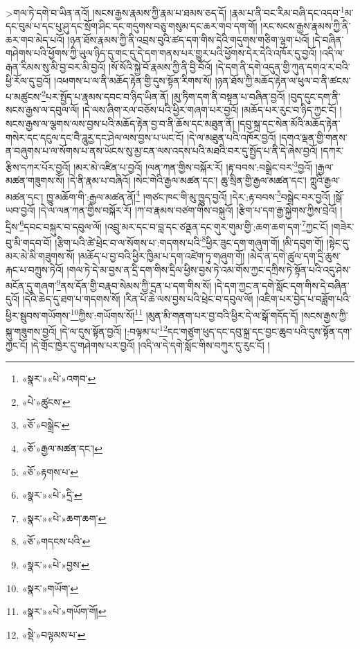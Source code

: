  >གལ་ཏེ་དགེ་བ་ཡིན་ནའོ། །སངས་རྒྱས་རྣམས་ཀྱི་རྣམ་པ་ཐམས་ཅད་དོ། །རྣམ་པ་ནི་བང་རིམ་བཞི་དང་འདབ་\footnote{«སྣར་»«པེ་»འགབ་}མ་དང་བུམ་པ་དང་པུ་ཤུ་དང་སྲོག་ཤིང་དང་གདུགས་བཅུ་གསུམ་དང་ཆར་གབ་དག་གོ། །རང་སངས་རྒྱས་རྣམས་ཀྱི་ནི་ཆར་གབ་མེད་པའོ། །ཉན་ཐོས་རྣམས་ཀྱི་ནི་འབྲས་བུའི་ཚད་དག་གིས་དེའི་གདུགས་གཅིག་ལྷག་པའོ། །དེ་བཞིན་གཤེགས་པའི་ཕྱོགས་ཀྱི་ཡུལ་ཉིད་དུ་གང་དུ་དེ་དག་གནས་པར་གྱུར་པའི་ཕྱོགས་དེར་དེའི་འཁོར་དུ་བྱའོ། །འདི་ལ་རྒན་རིམས་སུ་མི་བྱ་བར་མི་བྱའོ། །སོ་སོའི་སྐྱེ་བོ་རྣམས་ཀྱི་ནི་བྱི་བོའོ། །དེ་དག་ནི་དགེ་འདུན་གྱི་ཀུན་དགའ་ར་བའི་ཕྱི་རོལ་དུ་བྱའོ། །འཕགས་པ་ལ་ནི་མཆོད་རྟེན་གྱི་དུས་སྟོན་རིགས་སོ། །ཉན་ཐོས་ཀྱི་མཆོད་རྟེན་ལ་ཕུལ་བ་ནི་ཚངས་པ་མཚུངས་\footnote{«པེ་»ཚུངས་}པར་སྤྱོད་པ་རྣམས་དབང་བ་ཉིད་ཡིན་ནོ། །མུ་ཏིག་དག་ནི་བསྟན་པ་བཞིན་བྱའོ། །བུད་དུང་དག་ནི་སངས་རྒྱས་ལ་དབུལ་ལོ། །དེ་ལས་ཞིག་རལ་བཅོས་པའི་ཕྱིར་གཞག་པར་བྱའོ། །མཆོད་པར་རུང་བ་ཉིད་ཀྱང་ངོ། །སངས་རྒྱས་ལ་ལྕགས་ལས་བྱས་པའི་མཆོད་རྟེན་བྱ་བ་ནི་ཆོས་དང་མཐུན་ནོ། །དབུ་སྐྲ་དང་སེན་མོའི་མཆོད་རྟེན་གསེར་དང་དངུལ་དང་བཻ་ཌཱུརྱ་དང་ཤེལ་ལས་བྱས་པ་ཡང་ངོ། །དེ་ལ་མཐུན་པའི་འཁོར་བྱའོ། །དགའ་ལྡན་གྱི་གནས་ན་བཞུགས་པ་ལ་སོགས་པ་ནས་ཡོངས་སུ་མྱ་ངན་ལས་འདས་པའི་མཐའི་བར་དུ་སྤྱོད་པ་ནི་དེ་ཞེས་བྱའོ། །དཀར་རྩིས་དཀར་པོར་བྱའོ། །མར་མེ་འཛིན་པ་བྱའོ། །ལན་ཀན་གྱིས་བསྐོར་རོ། །རྟ་བབས་:བསྒྲེང་བར་\footnote{«ཅོ་»བསྒྲེང་}བྱའོ། །རྒྱལ་མཚན་གཟུགས་སོ། །དེ་ནི་རྣམ་པ་བཞིའོ། །སེང་གེའི་རྒྱལ་མཚན་དང་། ཆུ་སྲིན་གྱི་རྒྱལ་མཚན་དང་། ཀླུའི་རྒྱལ་མཚན་དང་། ཁྱུ་མཆོག་གི་:རྒྱལ་མཚན་ནོ།\footnote{«ཅོ་»རྒྱལ་མཚན་དང་།} །གཙང་ཁང་གི་མུ་ཁྱུད་བྱའོ། །དེར་:རྟ་བབས་\footnote{«ཅོ་»རྟགས་པ་}བསྒྲེང་བར་བྱའོ། །སྒོ་ཡབ་བྱའོ། །དེ་ལ་ལན་ཀན་གྱིས་བསྐོར་རོ། །ཀ་བ་རྣམས་བཙག་གིས་བསྐུའོ། །རྩིག་པ་དག་རྒྱ་སྐྱེགས་ཀྱིས་བྲེའོ། །དྲིས་\footnote{«སྣར་»«པེ་»དྲི་}དབང་བསྐུར་བ་དབུལ་ལོ། །འབྲུ་མར་དང་བ་བླ་དང་ཙནྡན་དང་གུར་གུམ་གྱི་:ཆག་ཆག་དག་\footnote{«སྣར་»«པེ་»ཆག་ཆག་}ཀྱང་ངོ། །གཟེར་བུ་མི་གདབ་བོ། །རྩིག་པའི་ཚེ་ཕྲེང་བ་ལ་སོགས་པ་:གདགས་པའི་\footnote{«ཅོ་»གདངས་པའི་}ཕྱིར་ཟུང་དག་གཞུག་གོ། །མི་དབུག་གོ། །སྟེང་དུ་མར་མེ་མི་གཟུགས་སོ། །མཆོད་པ་བྱ་བའི་ཕྱིར་ཁྱིམ་པ་དག་འཛེག་ཏུ་གཞུག་གོ། །མེད་ན་དགེ་ཚུལ་དག་དྲི་ཆུས་རྐང་པ་བཀྲུས་ཏེའོ། །གལ་ཏེ་དེ་མ་བྱས་ན་དྲི་དག་གིས་དྲིལ་ཕྱིས་བྱས་ཏེ་འམ་གོས་ཀྱང་དཀྲིས་ཏེ་སྟོན་པའི་འདུ་ཤེས་མངོན་དུ་གཞག་\footnote{«སྣར་»«པེ་»བྱས་}ནས་དོན་གྱི་བརྣབ་སེམས་ཀྱི་དྲན་པ་དག་གིས་སོ། །དེ་དག་ཀྱང་ན་དགེ་སློང་དག་གིས་དེ་བཞིན་དུའོ། །དེའི་ཆེད་དུ་ཐག་པ་གདགས་སོ། །རིན་པོ་ཆེ་ལས་བྱས་པའི་ཕྲེང་བ་དབུལ་ལོ། །འཇིག་པར་བྱེད་པ་བཟློག་པའི་ཕྱིར་སྦུབས་གཡོགས་\footnote{«སྣར་»གཡོག་}ཀྱིས་:གཡོགས་སོ།\footnote{«སྣར་»«པེ་»གཡོག་གོ།} །མུན་མི་གནག་པར་བྱ་བའི་ཕྱིར་དེ་ལ་སྒོ་གདོད་དོ། །སངས་རྒྱས་ཀྱི་སྐུ་གཟུགས་བྱའོ། །དེ་ལ་དུས་སྟོན་བྱའོ། །:བལྟམ་པ་\footnote{«སྡེ་»བལྟམས་པ་}དང་གཙུག་ཕུད་དང་དབུ་སྐྲ་དང་བྱང་ཆུབ་པའི་དུས་སྟོན་དག་ཀྱང་ངོ། །དེ་གྲོང་ཁྱེར་དུ་གཤེགས་པར་བྱའོ། །འདི་ལ་དེ་དགེ་སློང་གིས་བཀུར་དུ་རུང་ངོ། །
